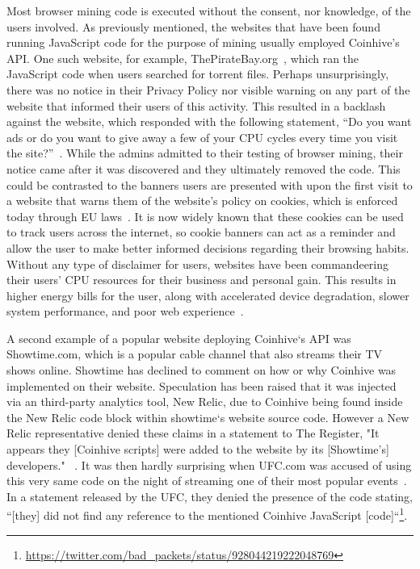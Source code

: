 Most browser mining code is executed without the consent, nor knowledge, of the users involved. As previously mentioned, the websites that have been found running JavaScript code for the purpose of mining usually employed Coinhive's API. One such website, for example, ThePirateBay.org~\cite{bbcmintcrypto}, which ran the JavaScript code when users searched for torrent files. Perhaps unsurprisingly, there was no notice in their Privacy Policy nor visible warning on any part of the website that informed their users of this activity. This resulted in a backlash against the website, which responded with the following statement, ``Do you want ads or do you want to give away a few of your CPU cycles every time you visit the site?''~\cite{piratesbayblog}. While the admins admitted to their testing of browser mining, their notice came after it was discovered and they ultimately removed the code. This could be contrasted to the banners users are presented with upon the first visit to a website that warns them of the website's policy on cookies, which is enforced today through EU laws~\cite{eucookie}. It is now widely known that these cookies can be used to track users across the internet, so cookie banners can act as a reminder and allow the user to make better informed decisions regarding their browsing habits. Without any type of disclaimer for users, websites have been commandeering their users' CPU resources for their business and personal gain. This results in higher energy bills for the user, along with accelerated device degradation, slower system performance, and poor web experience~\cite{httparchiveminingimpact,gaurdianelectricity}.


A second example of a popular website deploying Coinhive`s API was Showtime.com, which is a popular cable channel that also streams their TV shows online. Showtime has declined to comment on how or why Coinhive was implemented on their website. Speculation has been raised that it was injected via an third-party analytics tool, New Relic, due to Coinhive being found inside the New Relic code block within showtime`s website source code. However a New Relic representative denied these claims in a statement to The Register, "It appears they [Coinhive scripts] were added to the website by its [Showtime's] developers." ~\cite{registershowtime}. 
It was then hardly surprising when UFC.com was accused of using this very same code on the night of streaming one of their most popular events~\cite{registerufcmonero}. In a statement released by the UFC, they denied the presence of the code stating, ``[they] did not find any reference to the mentioned Coinhive JavaScript [code]``\footnote{\url{https://twitter.com/bad_packets/status/928044219222048769}}.
 
